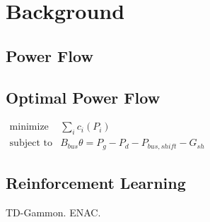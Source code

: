 \chapter{Background}

\section{Power Flow}

\section{Optimal Power Flow}

$
  \begin{array}{ll}
  \mbox{minimize}   & \sum_i c_i (P_i) \\
  \mbox{subject to} & B_{bus} \theta = P_g - P_d - P_{bus,shift} - G_{sh}
  \end{array}
$

\section{Reinforcement Learning}

TD-Gammon\cite{tesauro:gammon}. ENAC\cite{peters:enac}.
